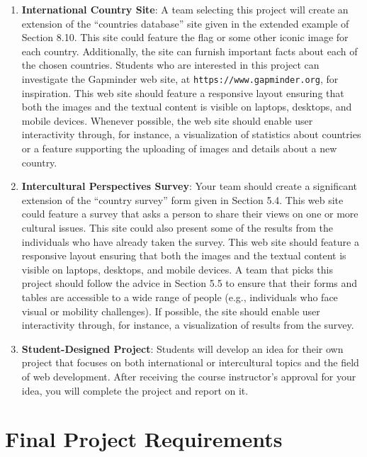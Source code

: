 \documentclass[11pt]{article}
\newcommand{\url}[1]{\lstinline{#1}}
\begin{document}
\begin{enumerate}
  \item {\bf International Country Site}: A team selecting this project will
    create an extension of the ``countries database'' site given in the extended
    example of Section 8.10. This site could feature the flag or some other
    iconic image for each country. Additionally, the site can furnish important
    facts about each of the chosen countries. Students who are interested in
    this project can investigate the Gapminder web site, at
    \url{https://www.gapminder.org}, for inspiration. This web site should
    feature a responsive layout ensuring that both the images and the textual
    content is visible on laptops, desktops, and mobile devices. Whenever
    possible, the web site should enable user interactivity through, for
    instance, a visualization of statistics about countries or a feature
    supporting the uploading of images and details about a new country.

  \item {\bf Intercultural Perspectives Survey}: Your team should create a
    significant extension of the ``country survey'' form given in Section 5.4.
    This web site could feature a survey that asks a person to share their views
    on one or more cultural issues. This site could also present some of the
    results from the individuals who have already taken the survey. This web
    site should feature a responsive layout ensuring that both the images and
    the textual content is visible on laptops, desktops, and mobile devices. A
    team that picks this project should follow the advice in Section 5.5 to
    ensure that their forms and tables are accessible to a wide range of people
    (e.g., individuals who face visual or mobility challenges). If possible, the
    site should enable user interactivity through, for instance, a visualization
    of results from the survey.

  \item {\bf Student-Designed Project}: Students will develop an idea for their
    own project that focuses on both international or intercultural topics and
    the field of web development. After receiving the course instructor's
    approval for your idea, you will complete the project and report on it.

\end{enumerate}

\section*{Final Project Requirements}
\end{document}
